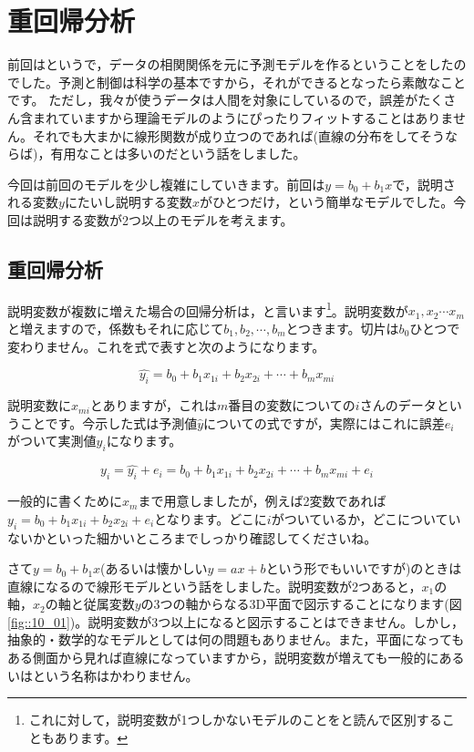 \documentclass{ltjbook}
\begin{document}
 
\chapter{重回帰分析} 
\label{chapter10} 

前回はというで，データの相関関係を元に予測モデルを作るということをしたのでした。予測と制御は科学の基本ですから，それができるとなったら素敵なことです。
ただし，我々が使うデータは人間を対象にしているので，誤差がたくさん含まれていますから理論モデルのようにぴったりフィットすることはありません。それでも大まかに線形関数が成り立つのであれば(直線の分布をしてそうならば)，有用なことは多いのだという話をしました。

今回は前回のモデルを少し複雑にしていきます。前回は$y=b_0+b_1x$で，説明される変数$y$にたいし説明する変数$x$がひとつだけ，という簡単なモデルでした。今回は説明する変数が2つ以上のモデルを考えます。

\section{重回帰分析}説明変数が複数に増えた場合の回帰分析は，と言います\footnote{これに対して，説明変数が1つしかないモデルのことをと読んで区別することもあります。}。説明変数が$x_1,x_2\cdots x_m$と増えますので，係数もそれに応じて$b_1,b_2,\cdots,b_m$とつきます。切片は$b_0$ひとつで変わりません。これを式で表すと次のようになります。

\[\hat{y_i}=b_0 + b_1x_{1i}+b_2x_{2i}+\cdots+b_mx_{mi}\]

説明変数に$x_{mi}$とありますが，これは$m$番目の変数についての$i$さんのデータということです。今示した式は予測値$\hat{y}$についての式ですが，実際にはこれに誤差$e_i$がついて実測値$y_i$になります。

\[ y_i = \hat{y_i} + e_i = b_0 + b_1x_{1i}+b_2x_{2i}+\cdots+b_mx_{mi} + e_i \]

一般的に書くために$x_m$まで用意しましたが，例えば2変数であれば$y_i = b_0 + b_1x_{1i}+b_2x_{2 i}+e_i$となります。どこに$i$がついているか，どこについていないかといった細かいところまでしっかり確認してくださいね。

さて$y=b_0 + b_1 x$(あるいは懐かしい$y=ax+b$という形でもいいですが)のときは直線になるので線形モデルという話をしました。説明変数が2つあると，$x_1$の軸，$x_2$の軸と従属変数$y$の3つの軸からなる3D平面で図示することになります(図\ref{fig::10_01})。説明変数が3つ以上になると図示することはできません。しかし，抽象的・数学的なモデルとしては何の問題もありません。また，平面になってもある側面から見れば直線になっていますから，説明変数が増えても一般的にあるいはという名称はかわりません。
\end{document}
